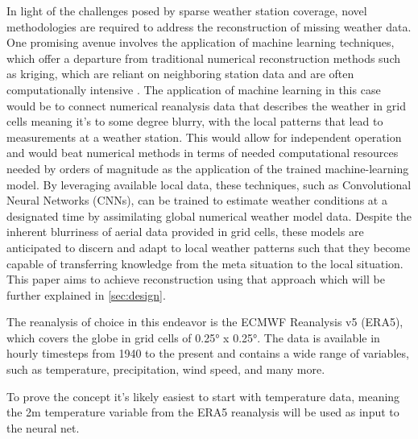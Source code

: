 In light of the challenges posed by sparse weather station coverage, novel methodologies are required to address the reconstruction of missing weather data. One promising avenue involves the application of machine learning techniques, which offer a departure from traditional numerical reconstruction methods such as kriging, which are reliant on neighboring station data and are often computationally intensive \cite{chung2019kriging}. The application of machine learning in this case would be to connect numerical reanalysis data that describes the weather in grid cells meaning it's to some degree blurry, with the local patterns that lead to measurements at a weather station. This would allow for independent operation and would beat numerical methods in terms of needed computational resources needed by orders of magnitude \cite{kurth2023MLperformance,bi2023MLperformance,lam2023MLperformance} as the application of the trained machine-learning model. By leveraging available local data, these techniques, such as Convolutional Neural Networks (CNNs), can be trained to estimate weather conditions at a designated time by assimilating global numerical weather model data. Despite the inherent blurriness of aerial data provided in grid cells, these models are anticipated to discern and adapt to local weather patterns such that they become capable of transferring knowledge from the meta situation to the local situation. This paper aims to achieve reconstruction using that approach which will be further explained in \autoref{sec:design}.


The reanalysis of choice in this endeavor is the ECMWF Reanalysis v5 (ERA5), which covers the globe in grid cells of 0.25° x 0.25°. The data is available in hourly timesteps from 1940 to the present and contains a wide range of variables, such as temperature, precipitation, wind speed, and many more. \cite{era5}


To prove the concept it's likely easiest to start with temperature data, meaning the 2m temperature variable from the ERA5 reanalysis will be used as input to the neural net.
